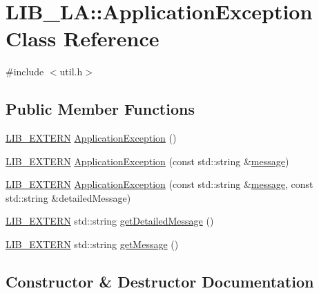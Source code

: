 \hypertarget{class_l_i_b___l_a_1_1_application_exception}{}\section{L\+I\+B\+\_\+\+LA\+:\+:Application\+Exception Class Reference}
\label{class_l_i_b___l_a_1_1_application_exception}


{\ttfamily \#include $<$util.\+h$>$}

\subsection*{Public Member Functions}
\begin{DoxyCompactItemize}
\item 
\hyperlink{libutil_8h_a48cc004c21e097c0d7c1c5fa8dc03b96}{L\+I\+B\+\_\+\+E\+X\+T\+E\+RN} \hyperlink{class_l_i_b___l_a_1_1_application_exception_a59b4b5d321f7141ea06a4db6f4b7ceb4}{Application\+Exception} ()
\item 
\hyperlink{libutil_8h_a48cc004c21e097c0d7c1c5fa8dc03b96}{L\+I\+B\+\_\+\+E\+X\+T\+E\+RN} \hyperlink{class_l_i_b___l_a_1_1_application_exception_ac3dce55c19829c829ea3db5b8c984fb3}{Application\+Exception} (const std\+::string \&\hyperlink{lp__lib_8h_a113fd968c78bb9d1464b0912bfceb58c}{message})
\item 
\hyperlink{libutil_8h_a48cc004c21e097c0d7c1c5fa8dc03b96}{L\+I\+B\+\_\+\+E\+X\+T\+E\+RN} \hyperlink{class_l_i_b___l_a_1_1_application_exception_ab0401cdea3ca90ec9091bb53d4427e33}{Application\+Exception} (const std\+::string \&\hyperlink{lp__lib_8h_a113fd968c78bb9d1464b0912bfceb58c}{message}, const std\+::string \&detailed\+Message)
\item 
\hyperlink{libutil_8h_a48cc004c21e097c0d7c1c5fa8dc03b96}{L\+I\+B\+\_\+\+E\+X\+T\+E\+RN} std\+::string \hyperlink{class_l_i_b___l_a_1_1_application_exception_a8abe845d6ce332f319b7aebdf3d6c88b}{get\+Detailed\+Message} ()
\item 
\hyperlink{libutil_8h_a48cc004c21e097c0d7c1c5fa8dc03b96}{L\+I\+B\+\_\+\+E\+X\+T\+E\+RN} std\+::string \hyperlink{class_l_i_b___l_a_1_1_application_exception_a808e7250427cd92ec8af279268313565}{get\+Message} ()
\end{DoxyCompactItemize}


\subsection{Constructor \& Destructor Documentation}
\mbox{\label{class_l_i_b___l_a_1_1_application_exception_a59b4b5d321f7141ea06a4db6f4b7ceb4}} 

